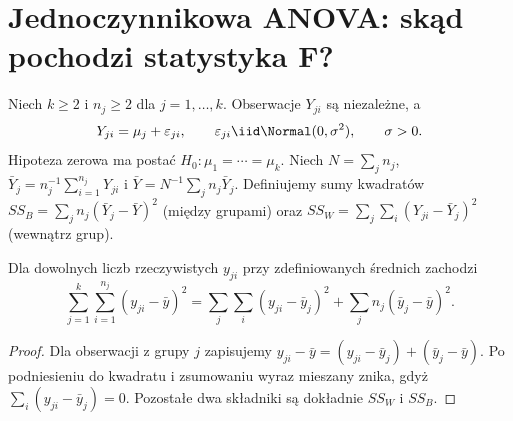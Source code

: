 \section{Jednoczynnikowa ANOVA: skąd pochodzi statystyka F?}
\label{sec:anova-introduction}
\begin{definicja}
Niech $k\ge2$ i $n_j\ge2$ dla $j=1,\ldots,k$.
Obserwacje $Y_{ji}$ są niezależne, a
\[
 Y_{ji}=\mu_j+\varepsilon_{ji},\qquad
 \varepsilon_{ji}\iid\Normal(0,\sigma^2),\qquad\sigma>0.
\]
Hipoteza zerowa ma postać
$H_0:\mu_1=\cdots=\mu_k$.
Niech $N=\sum_jn_j$,
$\bar Y_j=n_j^{-1}\sum_{i=1}^{n_j}Y_{ji}$ i
$\bar Y=N^{-1}\sum_jn_j\bar Y_j$.
Definiujemy sumy kwadratów
$SS_B=\sum_jn_j(\bar Y_j-\bar Y)^2$ (między grupami)
oraz $SS_W=\sum_j\sum_i(Y_{ji}-\bar Y_j)^2$
(wewnątrz grup).
\end{definicja}

\begin{lemat}
\label{lem:anova-decomp}
Dla dowolnych liczb rzeczywistych $y_{ji}$ przy
zdefiniowanych średnich zachodzi
\[
 \sum_{j=1}^k\sum_{i=1}^{n_j}(y_{ji}-\bar y)^2
 =\sum_j\sum_i(y_{ji}-\bar y_j)^2
 +\sum_jn_j(\bar y_j-\bar y)^2.
\]
\end{lemat}
\begin{proof}
Dla obserwacji z grupy $j$ zapisujemy
$y_{ji}-\bar y=(y_{ji}-\bar y_j)+(\bar y_j-\bar y)$.
Po podniesieniu do kwadratu i zsumowaniu wyraz mieszany
znika, gdyż $\sum_i(y_{ji}-\bar y_j)=0$.
Pozostałe dwa składniki są dokładnie $SS_W$ i $SS_B$.
\end{proof}


